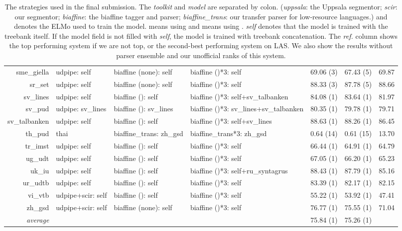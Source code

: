 \documentclass[11pt,a4paper]{article}
\begin{document}
\begin{table*}[t]
\begin{tabular}{rlllccc}
		sme\_giella & udpipe: self & biaffine (none): self & biaffine ()*3: self & 69.06 (3) & 67.43 (5) & 69.87  \\
		sr\_set & udpipe: self & biaffine (none): self & biaffine ()*3: self & 88.33 (3) & 87.78 (5) & 88.66 \\
		sv\_lines & udpipe: self & biaffine (): self & biaffine ()*3: self+sv\_talbanken & 84.08 (1) & 83.64 (1) & 81.97 \\
		sv\_pud & udpipe: sv\_lines & biaffine (): sv\_lines & biaffine ()*3: sv\_lines+sv\_talbanken & 80.35 (1) & 79.78 (1) & 79.71  \\
		sv\_talbanken & udpipe: self & biaffine (): self & biaffine ()*3: self+sv\_lines & 88.63 (1) & 88.26 (1) & 86.45 \\
		th\_pud & thai & biaffine\_trans: zh\_gsd & biaffine\_trans*3: zh\_gsd & 0.64 (14) & 0.61 (15) & 13.70 \\
		tr\_imst & udpipe: self & biaffine (): self & biaffine ()*3: self & 66.44 (1) & 64.91 (1) & 64.79 \\
		ug\_udt & udpipe: self & biaffine (): self & biaffine ()*3: self & 67.05 (1) & 66.20 (1)& 65.23 \\
		uk\_iu & udpipe: self & biaffine (): self & biaffine ()*3: self+ru\_syntagrus & 88.43 (1) & 87.79 (1) & 85.16 \\
		ur\_udtb & udpipe: self & biaffine (): self & biaffine ()*3: self & 83.39 (1) & 82.17 (1) & 82.15  \\
		vi\_vtb & udpipe+scir: self & biaffine (): self & biaffine ()*3: self & 55.22 (1) & 53.92 (1) & 47.41  \\
		zh\_gsd & udpipe+scir: self & biaffine (none): self & biaffine ()*3: self & 76.77 (1) & 75.55 (1) & 71.04  \\
		\hline
		\textit{average} & & & & 75.84 (1) & 75.26 (1) & 
	\end{tabular}
	\caption{The strategies used in the final submission. 
		The \textit{toolkit} and \textit{model} are separated by colon.
		(\textit{uppsala}: the Uppsala segmentor; \textit{scir}: our segmentor;
		\textit{biaffine}: the biaffine tagger and parser;
		\textit{biaffine\_trans}: our transfer parser for low-resource languages.)
		 and  denotes the ELMo used to train the model.
		 means using  and  means using .
		\textit{self} denotes that the model is trained with the treebank itself.
		If the model field is not filled with \textit{self}, the model is trained with treebank concatenation.
		The \textit{ref.} column shows the top performing system if we are not top, or the second-best performing system on LAS.
		We also show the results without parser ensemble and our unofficial ranks of this system.
}\label{tbl:big}
\end{table*}
\end{document}
